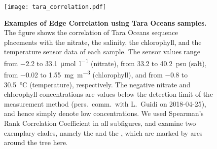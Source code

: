 \begin{figure}[!hpbt]
    \centering
    \texttt{[image: tara\_correlation.pdf]}
    \begin{subfigure}{0pt}
        \label{fig:tara_correlation:sub:nitrate}
    \end{subfigure}
    \begin{subfigure}{0pt}
        \label{fig:tara_correlation:sub:salinity}
    \end{subfigure}
    \begin{subfigure}{0pt}
        \label{fig:tara_correlation:sub:chlorophyll}
    \end{subfigure}
    \begin{subfigure}{0pt}
        \label{fig:tara_correlation:sub:temperature}
    \end{subfigure}
    \caption[Examples of Edge Correlation using Tara Oceans samples]{
        \textbf{Examples of Edge Correlation using Tara Oceans samples.}
        The figure shows the correlation of Tara Oceans sequence placements with
         the nitrate,
         the salinity,
         the chlorophyll, and
         the temperature sensor data of each sample.
        The sensor values range from \SI{-2.2}{} to \SI[per-mode=symbol]{33.1}{\micro\mole\per\litre} (nitrate),
        from \SI{33.2}{} to \SI{40.2}{psu} (salt),
        from \SI{-0.02}{} to \SI[per-mode=symbol]{1.55}{\milli\gram\per\cubic\metre} (chlorophyll), and
        from \SI{-0.8}{} to \SI{30.5}{\celsius} (temperature), respectively.
        The negative nitrate and chlorophyll concentrations are
        values below the detection limit of the measurement method (pers.~comm.~with L.~Guidi on 2018-04-25),
        and hence simply denote low concentrations.
        We used Spearman's Rank Correlation Coefficient in all subfigures,
        and examine two exemplary clades, namely the  and the ,
        which are marked by arcs around the tree here.
    }
    \label{fig:tara_correlation}
\end{figure}

